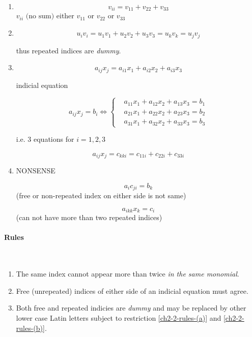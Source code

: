 \begin{enumerate}[label= e.g. \arabic*)]

\item
\[v_{ii}=v_{11}+v_{22}+v_{33}\]
$v_{ii}\text{ (no sum)}$ either $v_{11}$ or $v_{22}$ or $v_{33}$

\item
\[u_iv_i=u_1v_1+u_2v_2+u_3v_3=u_kv_k=u_jv_j\]

thus repeated indices are \emph{dummy}.

\item
\[a_{ij}x_j=a_{i1}x_1+a_{i2}x_2+a_{i3}x_3\]

indicial equation

\[
a_{ij}x_j=b_i\Longleftrightarrow
\left\{\begin{aligned}
& a_{11}x_1+a_{12}x_2+a_{13}x_3=b_1\\
& a_{21}x_1+a_{22}x_2+a_{23}x_3=b_2\\
& a_{31}x_1+a_{32}x_2+a_{33}x_3=b_3
\end{aligned}\right.
\]

i.e. 3 equations for $i = 1,2,3$

\[a_{ij}x_j=c_{kki}=c_{11i}+c_{22i}+c_{33i}\]

\item NONSENSE

\[a_{i}c_{ji}=b_k\]
(free or non-repeated index on either side is not same)

\[a_{ikk}x_k=c_i\]
(can not have more than two repeated indices)



\end{enumerate}

\paragraph{Rules}\mbox{}\\


\begin{enumerate}[label= (\alph*)]

\item \label{ch2-2-rules-(a)}
The same index cannot appear more than twice \emph{in the same monomial}.

\item \label{ch2-2-rules-(b)}
Free (unrepeated) indices of either side of an indicial equation must agree.
\item
Both free and repeated indicies are \emph{dummy} and may be replaced by other lower case Latin letters subject to restriction \ref{ch2-2-rules-(a)} and \ref{ch2-2-rules-(b)}.

\end{enumerate}

